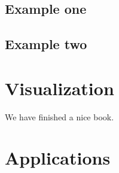 \documentclass[]{book}
\begin{document}
\section{Example one}\label{example-one}

\section{Example two}\label{example-two}

\chapter{Visualization}\label{visualization}

We have finished a nice book.

\chapter{Applications}\label{applications}


\end{document}

